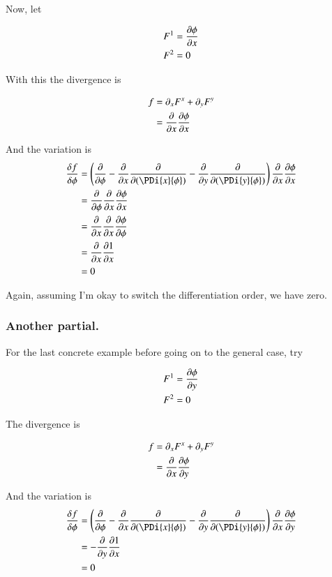 \documentclass{article}
\begin{document}
Now, let 

\begin{align*}
F^1 &= \frac{\partial {\phi}}{\partial {x}} \\
F^2 &= 0 \\
\end{align*}

With this the divergence is 

\begin{align*}
f 
&= \partial_x F^x + \partial_y F^y  \\
&=
\frac{\partial {}}{\partial {x}}\frac{\partial {\phi}}{\partial {x}}
\end{align*}

And the variation is
\begin{align*}
\frac{\delta f}{\delta \phi} 
&= 
\left( \PD{\phi}{} 
- \PD{x}{}\PD{(\PDi{x}{\phi})}{} 
- \PD{y}{}\PD{(\PDi{y}{\phi})}{} 
\right) \PD{x}{}\PD{x}{\phi} \\
&= 
\PD{\phi}{} \PD{x}{}\PD{x}{\phi} \\
&= 
\PD{x}{} \PD{x}{}\PD{\phi}{\phi} \\
&= 
\PD{x}{} \PD{x}{1} \\
&= 0
\end{align*}

Again, assuming I'm okay to switch the differentiation order, we have zero.

\subsubsection{ Another partial. }

For the last concrete example before going on to the general case, try

\begin{align*}
F^1 &= \frac{\partial {\phi}}{\partial {y}} \\
F^2 &= 0 \\
\end{align*}

The divergence is 

\begin{align*}
f 
&= \partial_x F^x + \partial_y F^y  \\
&=
\frac{\partial {}}{\partial {x}}\frac{\partial {\phi}}{\partial {y}}
\end{align*}

And the variation is
\begin{align*}
\frac{\delta f}{\delta \phi} 
&= 
\left( \PD{\phi}{} 
- \PD{x}{}\PD{(\PDi{x}{\phi})}{} 
- \PD{y}{}\PD{(\PDi{y}{\phi})}{} 
\right) \PD{x}{}\PD{y}{\phi} \\
&= 
- \PD{y}{}\PD{x}{1} \\
&= 0
\end{align*}
\end{document}
